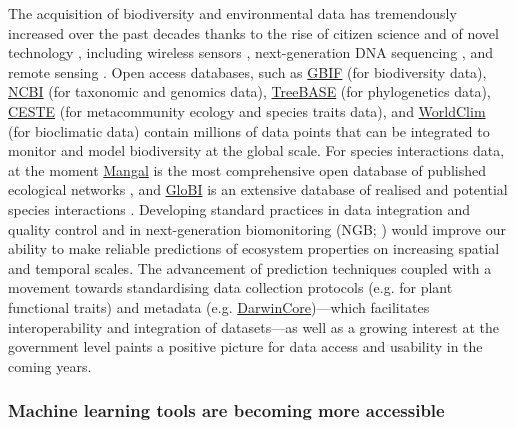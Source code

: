 The acquisition of biodiversity and environmental data has tremendously
increased over the past decades thanks to the rise of citizen science
\cite{Dickinson2010CitSci} and of novel technology
\cite{Stephenson2020TecAdv}, including wireless sensors
\cite{Porter2005WirSen}, next-generation DNA sequencing
\cite{Creer2016EcoSF}, and remote sensing \cite{Skidmore2015AgrBio,
Lausch2016LinEar}. Open access databases, such as
\href{https://www.gbif.org/}{GBIF} (for biodiversity data),
\href{https://www.ncbi.nlm.nih.gov/}{NCBI} (for taxonomic and genomics
data), \href{https://www.treebase.org/treebase-web/home.html}{TreeBASE}
(for phylogenetics data), \href{https://icestes.github.io/}{CESTE}
\cite{Jeliazkov2020GloDat} (for metacommunity ecology and species traits
data), and \href{https://www.worldclim.org/data/bioclim.html}{WorldClim}
(for bioclimatic data) contain millions of data points that can be
integrated to monitor and model biodiversity at the global scale. For
species interactions data, at the moment
\href{https://mangal.io/#/}{Mangal} is the most comprehensive open
database of published ecological networks \cite{Poisot2016ManMak}, and
\href{https://www.globalbioticinteractions.org/about}{GloBI} is an
extensive database of realised and potential species interactions
\cite{Poelen2014GloBio}. Developing standard practices in data
integration and quality control \cite{Kissling2018BuiEss} and in
next-generation biomonitoring (NGB; \cite{Makiola2020KeyQue}) would
improve our ability to make reliable predictions of ecosystem properties
on increasing spatial and temporal scales. The advancement of prediction
techniques coupled with a movement towards standardising data collection
protocols (e.g. \cite{Perez-Harguindeguy2013NewHan} for plant functional
traits) and metadata (e.g.
\href{https://www.tdwg.org}{DarwinCore})---which facilitates
interoperability and integration of datasets---as well as a growing
interest at the government level \cite{Scholes2012BuiGlo} paints a
positive picture for data access and usability in the coming years.

\subsubsection{Machine learning tools are becoming more
accessible}\label{machine-learning-tools-are-becoming-more-accessible}

